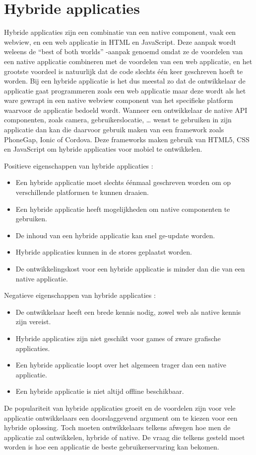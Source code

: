 \section{Hybride applicaties}\label{section:hybride}

Hybride applicaties zijn een combinatie van een native component, vaak een webview, en een web applicatie in HTML en JavaScript. Deze aanpak wordt weleens de “best of both worlds” -aanpak genoemd omdat ze de voordelen van een native applicatie combineren met de voordelen van een web applicatie, en het grootste voordeel is natuurlijk dat de code slechts één keer geschreven hoeft te worden. Bij een hybride applicatie is het dus meestal zo dat de ontwikkelaar de applicatie gaat programmeren zoals een web applicatie maar deze wordt als het ware gewrapt in een native webview component van het specifieke platform waarvoor de applicatie bedoeld wordt. 
Wanneer een ontwikkelaar de native API componenten, zoals camera, gebruikerslocatie, … wenst te gebruiken in zijn applicatie dan kan die daarvoor gebruik maken van een framework zoals PhoneGap, Ionic of Cordova. Deze frameworks maken gebruik van HTML5, CSS en JavaScript om hybride applicaties voor mobiel te ontwikkelen.

Positieve eigenschappen van hybride applicaties : 
\begin{itemize}
	\item Een hybride applicatie moet slechts éénmaal geschreven worden om op verschillende platformen te kunnen draaien. 
	\item Een hybride applicatie heeft mogelijkheden om native componenten te gebruiken.
	\item De inhoud van een hybride applicatie kan snel ge-update worden.
	\item Hybride applicaties kunnen in de stores geplaatst worden.
	\item De ontwikkelingskost voor een hybride applicatie is minder dan die van een native applicatie.
\end{itemize}
Negatieve eigenschappen van hybride applicaties : 
\begin{itemize}
	\item De ontwikkelaar heeft een brede kennis nodig, zowel web als native kennis zijn vereist.
	\item Hybride applicaties zijn niet geschikt voor games of zware grafische applicaties.
	\item Een hybride applicatie loopt over het algemeen trager dan een native applicatie.
	\item Een hybride applicatie is niet altijd offline beschikbaar.
\end{itemize}
De populariteit van hybride applicaties groeit en de voordelen zijn voor vele applicatie ontwikkelaars een doorslaggevend argument om te kiezen voor een hybride oplossing. Toch moeten ontwikkelaars telkens afwegen hoe men de applicatie zal ontwikkelen, hybride of native. De vraag die telkens gesteld moet worden is hoe een applicatie de beste gebruikerservaring kan bekomen.


